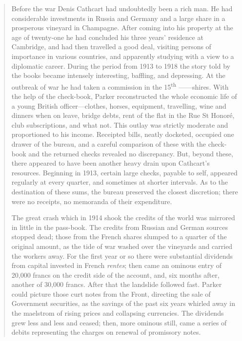 \begin{quotation}
Before the war Denis Cathcart had undoubtedly been a rich man. He had considerable investments in Russia and Germany and a large share in a prosperous vineyard in Champagne. After coming into his property at the age of twenty-one he had concluded his three years' residence at Cambridge, and had then travelled a good deal, visiting persons of importance in various countries, and apparently studying with a view to a diplomatic career. During the period from 1913 to 1918 the story told by the books became intensely interesting, baffling, and depressing. At the outbreak of war he had taken a commission in the 15\textsuperscript{th} ------shires.  With the help of the check-book, Parker reconstructed the whole economic life of a young British officer\allowbreak---\allowbreak clothes, horses, equipment, travelling, wine and dinners when on leave, bridge debts, rent of the flat in the Rue St Honoré, club subscriptions, and what not. This outlay was strictly moderate and proportioned to his income. Receipted bills, neatly docketed, occupied one drawer of the bureau, and a careful comparison of these with the check-book and the returned checks revealed no discrepancy. But, beyond these, there appeared to have been another heavy drain upon Cathcart's resources. Beginning in 1913, certain large checks, payable to self, appeared regularly at every quarter, and sometimes at shorter intervals. As to the destination of these sums, the bureau preserved the closest discretion; there were no receipts, no memoranda of their expenditure.

The great crash which in 1914 shook the credits of the world was mirrored in little in the pass-book. The credits from Russian and German sources stopped dead; those from the French shares slumped to a quarter of the original amount, as the tide of war washed over the vineyards and carried the workers away. For the first year or so there were substantial dividends from capital invested in French \textit{rentes}; then came an ominous entry of 20,000 francs on the credit side of the account, and, six months after, another of 30,000 francs. After that the landslide followed fast. Parker could picture those curt notes from the Front, directing the sale of Government securities, as the savings of the past six years whirled away in the maelstrom of rising prices and collapsing currencies. The dividends grew less and less and ceased; then, more ominous still, came a series of debits representing the charges on renewal of promissory notes.


\end{quotation}
